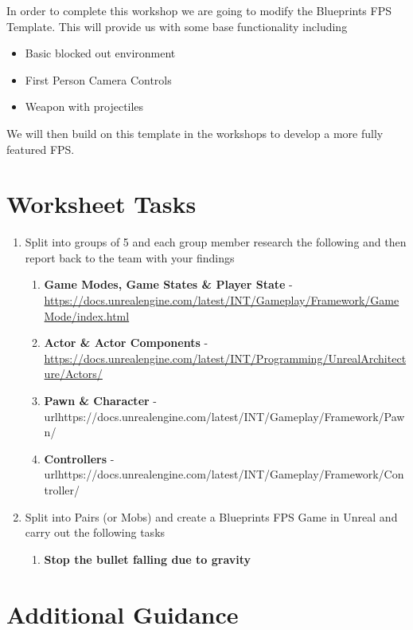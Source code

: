 \documentclass{../../fal_assignment}
\begin{document}
In order to complete this workshop we are going to modify the Blueprints FPS Template. This will provide us with some base functionality including 

\begin{itemize}
	\item Basic blocked out environment
	\item First Person Camera Controls
	\item Weapon with projectiles
\end{itemize}

We will then build on this template in the workshops to develop a more fully featured FPS.

\section*{Worksheet Tasks}

\begin{enumerate}
	\item Split into groups of 5 and each group member research the following and then report back to  the team with your findings
	\begin{enumerate}[label=(\Alph*)]
		\item \textbf{Game Modes, Game States \& Player State} - \url{https://docs.unrealengine.com/latest/INT/Gameplay/Framework/GameMode/index.html}
		\item \textbf{Actor \& Actor Components} - \url{https://docs.unrealengine.com/latest/INT/Programming/UnrealArchitecture/Actors/}
		\item \textbf{Pawn \& Character} - url{https://docs.unrealengine.com/latest/INT/Gameplay/Framework/Pawn/}
		\item \textbf{Controllers} - url{https://docs.unrealengine.com/latest/INT/Gameplay/Framework/Controller/}
	\end{enumerate}
	\item Split into Pairs (or Mobs) and create a Blueprints FPS Game in Unreal and carry out the following tasks
		\begin{enumerate}[label=(\Alph*)]
		\item \textbf{Stop the bullet falling due to gravity}
		\end{enumerate}
\end{enumerate}

\section*{Additional Guidance}
\end{document}
